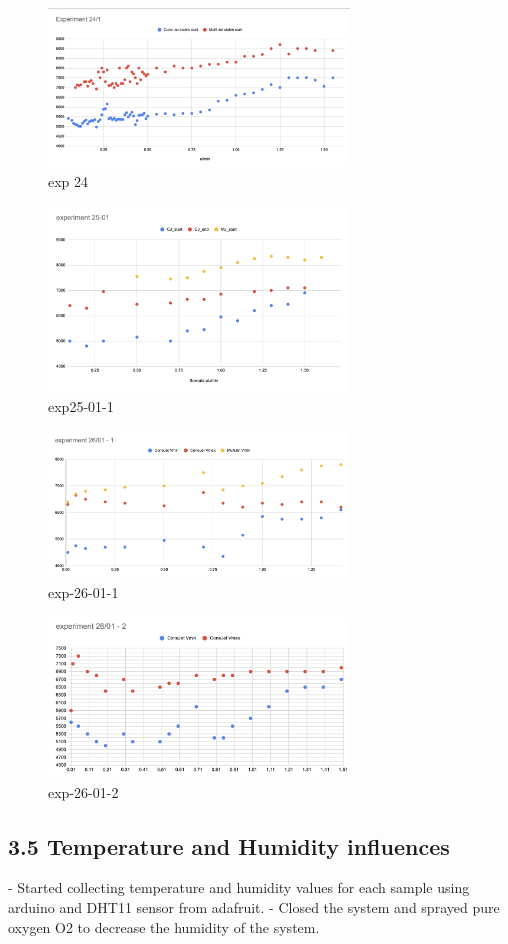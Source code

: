     \begin{figure}[H]
        \center
        \includegraphics[width=8cm]{joao_26-01-22/epx_24-01.png}
        \caption{exp 24}
    \end{figure}

    \begin{figure}[H]
        \center
        \includegraphics[width=8cm]{joao_26-01-22/exp25-01-1.png}
        \caption{ exp25-01-1 }
    \end{figure}

    \begin{figure}[H]
        \center
        \includegraphics[width=8cm]{joao_26-01-22/exp-26-01-1.png}
        \caption{ exp-26-01-1 }
    \end{figure}

    \begin{figure}[H]
        \center
        \includegraphics[width=8cm]{joao_26-01-22/exp26-01-2.png}
        \caption{ exp-26-01-2 }
    \end{figure}





\subsection*{3.5 Temperature and Humidity influences}

    - Started collecting temperature and humidity values for each sample using arduino and DHT11 sensor from adafruit.
    - Closed the system and sprayed pure oxygen O2 to decrease the humidity of the system.


